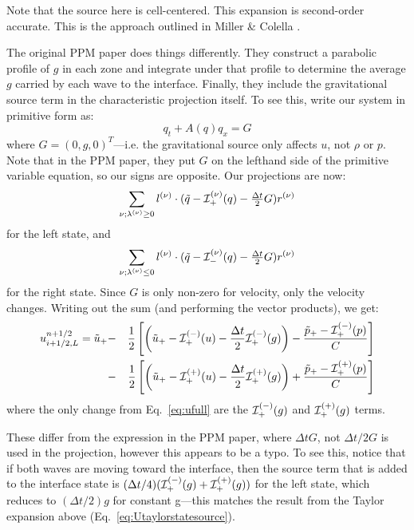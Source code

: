 \begin{itemize}
Note that the source here is cell-centered.  This expansion is
second-order accurate.  This is the approach outlined in Miller 
\& Colella \cite{millercolella:2002}.

The original PPM paper does things differently.  They construct a parabolic
profile of $g$ in each zone and integrate under that profile to determine
the average $g$ carried by each wave to the interface.  Finally, they include
the gravitational source term in the characteristic projection itself.
To see this, write our system in primitive form as:
\begin{equation}
q_t + A(q) q_x = G
\end{equation}
where $G = (0, g, 0)^T$---i.e. the gravitational source only affects
$u$, not $\rho$ or $p$.  Note that in the PPM paper, they put $G$ on 
the lefthand side of the primitive variable equation, so our signs are
opposite.  Our projections are now:
\begin{equation}
\sum_{\nu; \lambda^{(\nu)} \ge 0}l^{(\nu)} \cdot (\tilde{q} - \mathcal{I}^{(\nu)}_+(q) - \tfrac{\Delta t}{2} G) r^{(\nu)}
\end{equation}
for the left state, and
\begin{equation}
\sum_{\nu; \lambda^{(\nu)} \le 0} l^{(\nu)} \cdot (\tilde{q} - \mathcal{I}^{(\nu)}_-(q) - \tfrac{\Delta t}{2} G) r^{(\nu)} 
\end{equation}
for the right state.  Since $G$ is only non-zero for velocity, only
the velocity changes.  Writing out the sum (and performing the vector products), we
get:
\begin{eqnarray}
u_{i+1/2,L}^{n+1/2} =
   \tilde{u}_+ 
  &-& \frac{1}{2} \left [
      \left (\tilde{u}_+ - \mathcal{I}_+^{(-)}(u) - \frac{\Delta t}{2} \mathcal{I}^{(-)}_+(g) \right ) - 
       \frac{\tilde{p}_+ - \mathcal{I}_+^{(-)}(p)}{C} \right ] \nonumber \\
  &-& \frac{1}{2} \left [
      \left (\tilde{u}_+ - \mathcal{I}_+^{(+)}(u) - \frac{\Delta t}{2} \mathcal{I}^{(+)}_+(g) \right ) +
       \frac{\tilde{p}_+ - \mathcal{I}_+^{(+)}(p)}{C} \right ]
\end{eqnarray}
where the only change from Eq.~\ref{eq:ufull} are the
$\mathcal{I}^{(-)}_+(g)$ and $\mathcal{I}^{(+)}_+(g)$ terms.  

These differ from the expression in the PPM paper, where $\Delta t G$,
not $\Delta t/2 G$ is used in the projection, however this appears to
be a typo.  To see this, notice that if both waves are moving toward
the interface, then the source term that is added to the interface
state is $(\Delta t/4) (\mathcal{I}_+^{(-)}(g) +
\mathcal{I}_+^{(+)}(g))$ for the left state, which reduces to $(\Delta
t/2) g$ for constant g---this matches the result from the Taylor
expansion above (Eq.~\ref{eq:Utaylorstatesource}).




\end{itemize}
